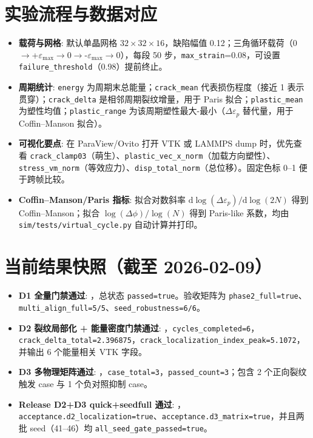 \documentclass[11pt]{article}
\begin{document}
\section{实验流程与数据对应}
\begin{itemize}
    \item \textbf{载荷与网格}: 默认单晶网格 $32\times32\times16$，缺陷幅值 0.12；三角循环载荷（0$\rightarrow$+$\varepsilon_{\max}\rightarrow$0$\rightarrow$-$\varepsilon_{\max}\rightarrow$0），每段 50 步，\texttt{max\_strain}=0.08，可设置 \texttt{failure\_threshold}（0.98）提前终止。
    \item \textbf{周期统计}: \texttt{energy} 为周期末总能量；\texttt{crack\_mean} 代表损伤程度（接近 1 表示贯穿）；\texttt{crack\_delta} 是相邻周期裂纹增量，用于 Paris 拟合；\texttt{plastic\_mean} 为塑性均值；\texttt{plastic\_range} 为该周期塑性最大-最小（$\Delta\varepsilon_p$ 替代量，用于 Coffin--Manson 拟合）。
    \item \textbf{可视化要点}: 在 ParaView/Ovito 打开 VTK 或 LAMMPS dump 时，优先查看 \texttt{crack\_clamp03}（萌生）、\texttt{plastic\_vec\_x\_norm}（加载方向塑性）、\texttt{stress\_vm\_norm}（等效应力）、\texttt{disp\_total\_norm}（总位移）。固定色标 0--1 便于跨帧比较。
    \item \textbf{Coffin--Manson/Paris 指标}: 拟合对数斜率 $\mathrm{d}\log(\Delta\varepsilon_p)/\mathrm{d}\log(2N)$ 得到 Coffin--Manson；拟合 $\log(\Delta\phi)/\log(N)$ 得到 Paris-like 系数，均由 \texttt{sim/tests/virtual\_cycle.py} 自动计算并打印。
\end{itemize}

\section{当前结果快照（截至 2026-02-09）}
\begin{itemize}
    \item \textbf{D1 全量门禁通过}: \texttt{}，总状态 \texttt{passed=true}。验收矩阵为 \texttt{phase2\_full=true}、\texttt{multi\_align\_full=5/5}、\texttt{seed\_robustness=6/6}。
    \item \textbf{D2 裂纹局部化 + 能量密度门禁通过}: \texttt{}，\texttt{cycles\_completed=6}，\texttt{crack\_delta\_total=2.396875}，\texttt{crack\_localization\_index\_peak=5.1072}，并输出 6 个能量相关 VTK 字段。
    \item \textbf{D3 多物理矩阵通过}: \texttt{}，\texttt{case\_total=3}，\texttt{passed\_count=3}；包含 2 个正向裂纹触发 case 与 1 个负对照抑制 case。
    \item \textbf{Release D2+D3 quick+seedfull 通过}: \texttt{}，\texttt{acceptance.d2\_localization=true}、\texttt{acceptance.d3\_matrix=true}，并且两批 seed（41--46）均 \texttt{all\_seed\_gate\_passed=true}。
\end{itemize}
\end{document}
